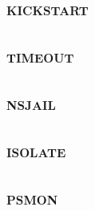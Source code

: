 \subsection{\textsc{kickstart}}

\subsection{\textsc{timeout}}

\subsection{\textsc{nsjail}}
\label{sec:resource.impl.nsjail}

\subsection{\textsc{isolate}}

\subsection{\textsc{psmon}}